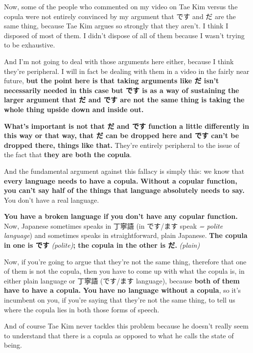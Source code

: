 \stopsectionlevel

\startsectionlevel[title={だ & です being the same copula},reference={だ-です-being-the-same-copula}]

Now, some of the people who commented on my video on Tae Kim versus the copula were not entirely convinced by my argument that です and だ are the same thing, because Tae Kim argues so strongly that they aren't. I think I disposed of most of them. I didn't dispose of all of them because I wasn't trying to be exhaustive.

{}

And I'm not going to deal with those arguments here either, because I think they're peripheral. I will in fact be dealing with them in a video in the fairly near future, {\bf but the point here is that taking arguments like だ isn't necessarily needed in this case but です is as a way of sustaining the larger argument that だ and です are not the same thing is taking the whole thing upside down and inside out.}

{\bf What's important is not that だ and です function a little differently in this way or that way, that だ can be dropped here and です can't be dropped there, things like that.} They're entirely peripheral to the issue of the fact that {\bf they are both the copula}.

And the fundamental argument against this fallacy is simply this: we know that {\bf every language needs to have a copula.} {\bf Without a copular function, you can't say half of the things that language absolutely needs to say.} You don't have a real language.

{\bf You have a broken language if you don't have any copular function.} Now, Japanese sometimes speaks in 丁寧語 (in です/ます speak {\em = polite language}) and sometimes speaks in straightforward, plain Japanese. {\bf The copula in one is です} {\em (polite)}{\bf ; the copula in the other is だ.} {\em (plain)}

Now, if you're going to argue that they're not the same thing, therefore that one of them is not the copula, then you have to come up with what the copula is, in either plain language or 丁寧語 (です/ます language), because {\bf both of them have to have a copula.} {\bf You have no language without a copula}, so it's incumbent on you, if you're saying that they're not the same thing, to tell us where the copula lies in both those forms of speech.

And of course Tae Kim never tackles this problem because he doesn't really seem to understand that there is a copula as opposed to what he calls the state of being.

